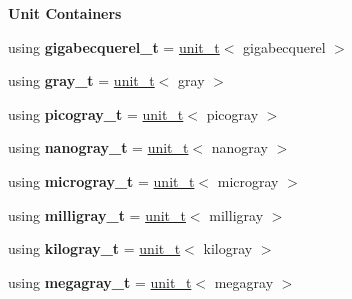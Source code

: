 \begin{Indent}{\bf Unit Containers}
\begin{DoxyCompactItemize}
\item 
\hypertarget{namespaceunits_1_1radiation_a38968b69ba4820a18de3097c4ada1ee6}{}using {\bfseries gigabecquerel\+\_\+t} = \hyperlink{classunits_1_1unit__t}{unit\+\_\+t}$<$ gigabecquerel $>$\label{namespaceunits_1_1radiation_a38968b69ba4820a18de3097c4ada1ee6}

\item 
\hypertarget{namespaceunits_1_1radiation_a641f29cf155f7eb513992c14cf626255}{}using {\bfseries gray\+\_\+t} = \hyperlink{classunits_1_1unit__t}{unit\+\_\+t}$<$ gray $>$\label{namespaceunits_1_1radiation_a641f29cf155f7eb513992c14cf626255}

\item 
\hypertarget{namespaceunits_1_1radiation_aac6a877eeda62dce4330e1e4f451bc94}{}using {\bfseries picogray\+\_\+t} = \hyperlink{classunits_1_1unit__t}{unit\+\_\+t}$<$ picogray $>$\label{namespaceunits_1_1radiation_aac6a877eeda62dce4330e1e4f451bc94}

\item 
\hypertarget{namespaceunits_1_1radiation_a53249ace1c66eaf02416d6aa2edf45a8}{}using {\bfseries nanogray\+\_\+t} = \hyperlink{classunits_1_1unit__t}{unit\+\_\+t}$<$ nanogray $>$\label{namespaceunits_1_1radiation_a53249ace1c66eaf02416d6aa2edf45a8}

\item 
\hypertarget{namespaceunits_1_1radiation_a5f9a89128ba2d00dc5f51dee73643276}{}using {\bfseries microgray\+\_\+t} = \hyperlink{classunits_1_1unit__t}{unit\+\_\+t}$<$ microgray $>$\label{namespaceunits_1_1radiation_a5f9a89128ba2d00dc5f51dee73643276}

\item 
\hypertarget{namespaceunits_1_1radiation_af5d9aec284f23cb733768043e9a48dcd}{}using {\bfseries milligray\+\_\+t} = \hyperlink{classunits_1_1unit__t}{unit\+\_\+t}$<$ milligray $>$\label{namespaceunits_1_1radiation_af5d9aec284f23cb733768043e9a48dcd}

\item 
\hypertarget{namespaceunits_1_1radiation_a72fac6412b71b585eef7fb326faf4905}{}using {\bfseries kilogray\+\_\+t} = \hyperlink{classunits_1_1unit__t}{unit\+\_\+t}$<$ kilogray $>$\label{namespaceunits_1_1radiation_a72fac6412b71b585eef7fb326faf4905}

\item 
\hypertarget{namespaceunits_1_1radiation_a9f3861973a69e13268d40a7e0e04ec95}{}using {\bfseries megagray\+\_\+t} = \hyperlink{classunits_1_1unit__t}{unit\+\_\+t}$<$ megagray $>$\label{namespaceunits_1_1radiation_a9f3861973a69e13268d40a7e0e04ec95}


\end{DoxyCompactItemize}
\end{Indent}
